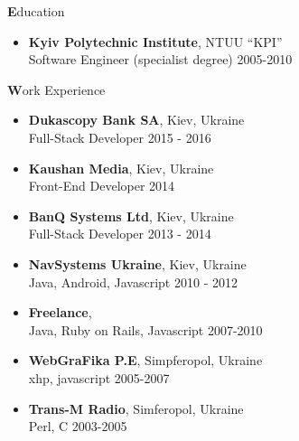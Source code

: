 \documentclass[a4paper,12pt]{article}
\begin{document}
{\begin{itemize}[itemsep=-2pt]
\end{itemize}

%
%

{\large \textbf{E}ducation}

\begin{itemize}[itemsep=-2pt]
  \item \textbf{Kyiv Polytechnic Institute}, NTUU ``KPI'' \\
  Software Engineer (specialist degree) \hfill 2005-2010
\end{itemize}

%
%


{\large \textbf{W}ork Experience}

\begin{itemize}[itemsep=-2pt]

  \item \textbf{Dukascopy Bank SA}, Kiev, Ukraine\\
    Full-Stack Developer \hfill  2015 - 2016

  \item \textbf{Kaushan Media}, Kiev, Ukraine \\
    Front-End Developer \hfill  2014

  \item \textbf{BanQ Systems Ltd}, Kiev, Ukraine\\
    Full-Stack Developer \hfill  2013 - 2014

  \item \textbf{NavSystems Ukraine}, Kiev, Ukraine\\
    Java, Android, Javascript \hfill  2010 - 2012

  \item \textbf{Freelance},\\
    Java, Ruby on Rails, Javascript \hfill 2007-2010

  \item \textbf{WebGraFika P.E}, Simpferopol, Ukraine \\
    xhp, javascript \hfill 2005-2007

  \item \textbf{Trans-M Radio\texttrademark}, Simferopol, Ukraine \\
    Perl, C \hfill 2003-2005

\end{itemize}


%
%

}
\end{document}
